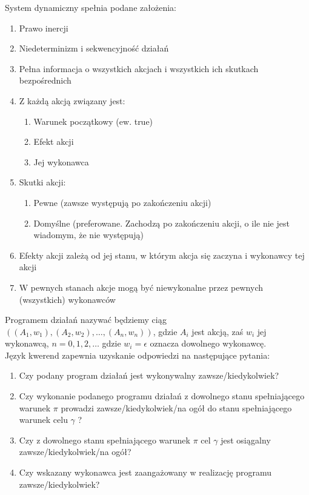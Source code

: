 \documentclass{article}
\begin{document}
System dynamiczny spełnia podane założenia:
\begin{enumerate}
\item Prawo inercji
\item Niedeterminizm i sekwencyjność działań
\item Pełna informacja o wszystkich akcjach i wszystkich ich skutkach bezpośrednich
\item Z każdą akcją związany jest:
\begin{enumerate}
\item Warunek początkowy (ew. true)
\item Efekt akcji
\item Jej wykonawca
\end{enumerate}
\item Skutki akcji:
\begin{enumerate}
\item Pewne (zawsze występują po zakończeniu akcji)
\item Domyślne (preferowane. Zachodzą po zakończeniu akcji, o ile nie jest wiadomym, że nie występują)
\end{enumerate}
\item Efekty akcji zależą od jej stanu, w którym akcja się zaczyna i wykonawcy tej akcji
\item W pewnych stanach akcje mogą być niewykonalne przez pewnych (wszystkich) wykonawców
\end{enumerate}

Programem działań nazywać będziemy ciąg $((A_{1},w_{1}), (A_{2},w_{2}), …, (A_{n},w_{n}))$, 
gdzie $A_{i}$ jest akcją, zaś $w_{i}$ jej wykonawcą, $n = 0, 1, 2, \dots$ gdzie $w_{i} = \epsilon$ oznacza dowolnego wykonawcę.\\


Język kwerend zapewnia uzyskanie odpowiedzi na następujące pytania:
\begin{enumerate}
\item Czy podany program działań jest wykonywalny zawsze/kiedykolwiek?
\item Czy wykonanie podanego programu działań z dowolnego stanu spełniającego warunek $\pi$ prowadzi zawsze/kiedykolwiek/na ogół do stanu spełniającego warunek celu $\gamma$ ?
\item Czy z dowolnego stanu spełniającego warunek $\pi$ cel $\gamma$ jest osiągalny zawsze/kiedykolwiek/na ogół?
\item Czy wskazany wykonawca jest zaangażowany w realizację programu zawsze/kiedykolwiek?
\end{enumerate}
\end{document}
